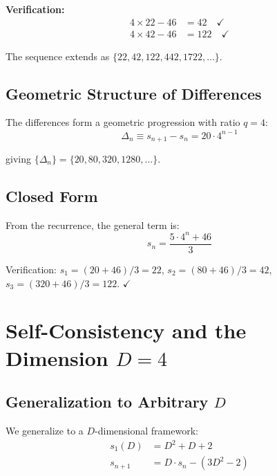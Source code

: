 \documentclass[11pt,a4paper]{article}
\begin{document}
\noindent\textbf{Verification:}
\begin{align}
4 \times 22 - 46 &= 42 \quad \checkmark \nonumber\\
4 \times 42 - 46 &= 122 \quad \checkmark
\end{align}

The sequence extends as $\{22, 42, 122, 442, 1722, \ldots\}$.

\subsection{Geometric Structure of Differences}

The differences form a geometric progression with ratio $q = 4$:
\begin{equation}
\Delta_n \equiv s_{n+1} - s_n = 20 \cdot 4^{n-1}
\label{eq:differences}
\end{equation}

giving $\{\Delta_n\} = \{20, 80, 320, 1280, \ldots\}$.

\subsection{Closed Form}

From the recurrence, the general term is:
\begin{equation}
s_n = \frac{5 \cdot 4^n + 46}{3}
\label{eq:closed_form}
\end{equation}

Verification: $s_1 = (20+46)/3 = 22$, $s_2 = (80+46)/3 = 42$, $s_3 = (320+46)/3 = 122$. $\checkmark$

\section{Self-Consistency and the Dimension $D=4$}

\subsection{Generalization to Arbitrary $D$}

We generalize to a $D$-dimensional framework:
\begin{align}
s_1(D) &= D^2 + D + 2 \label{eq:s1D}\\
s_{n+1} &= D \cdot s_n - (3D^2 - 2) \label{eq:recurrenceD}
\end{align}
\end{document}
